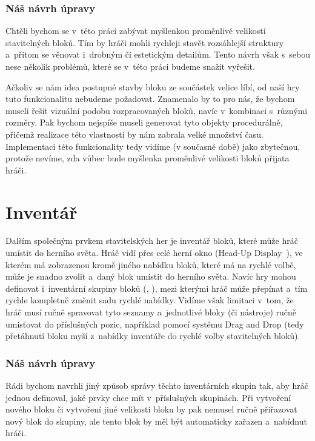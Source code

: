 \subsubsection{Náš návrh úpravy}
Chtěli bychom se v~této práci zabývat myšlenkou proměnlivé velikosti stavitelných bloků. Tím by hráči mohli rychleji stavět rozsáhlejší struktury a~přitom se věnovat i~drobným či estetickým detailům. Tento návrh však s~sebou nese několik problémů, které se v~této práci budeme snažit vyřešit.

Ačkoliv se nám idea postupné stavby bloku ze součástek velice líbí, od naší hry tuto funkcionalitu nebudeme požadovat. Znamenalo by to pro nás, že bychom museli řešit vizuální podobu rozpracovaných bloků, navíc v~kombinaci s~různými rozměry. Pak bychom nejspíše museli generovat tyto objekty procedurálně, přičemž realizace této vlastnosti by nám zabrala velké množství času. Implementaci této funkcionality tedy vidíme (v současné době) jako zbytečnou, protože nevíme, zda vůbec bude myšlenka proměnlivé velikosti bloků přijata hráči.


\section{Inventář}
Dalším společným prvkem stavitelských her je inventář bloků, které může hráč umístit do herního světa. Hráč vidí přes celé herní okno \HUD{} (Head-Up Display~\citep{hud_terminology}), ve kterém má zobrazenou kromě jiného nabídku bloků, které má na rychlé volbě, může je snadno zvolit a~daný blok umístit do herního světa. Navíc hry mohou definovat i~inventární skupiny bloků (\SE{}, \ME{}), mezi kterými hráč může přepínat a~tím rychle kompletně změnit sadu rychlé nabídky. Vidíme však limitaci v~tom, že hráč musí ručně spravovat tyto seznamy a~jednotlivé bloky (či nástroje) ručně umisťovat do příslušných pozic, například pomocí systému Drag and Drop (tedy přetáhnutí bloku myší z~nabídky inventáře do rychlé volby stavitelných bloků).


\subsubsection{Náš návrh úpravy}
Rádi bychom navrhli jiný způsob správy těchto inventárních skupin tak, aby hráč jednou definoval, jaké prvky chce mít v~příslušných skupinách. Při vytvoření nového bloku či vytvoření jiné velikosti bloku by pak nemusel ručně přiřazovat nový blok do skupiny, ale tento blok by měl být automaticky zařazen a~nabídnut hráči. 


